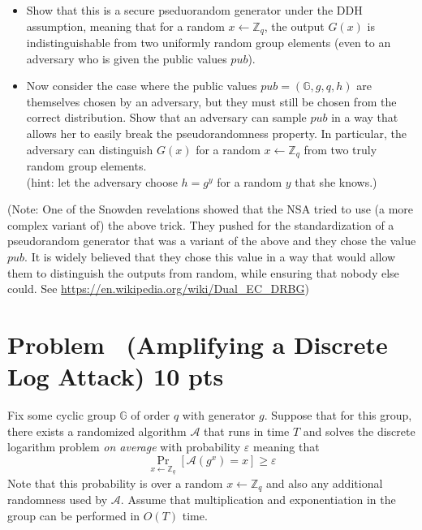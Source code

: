 \documentclass[11pt]{article}
\newcounter{pppp}
\newcommand{\prob}{\arabic{pppp}}  %
\newcommand{\increase}{\addtocounter{pppp}{1}}  %
\newcommand{\newproblem}[2]{\increase
\section*{Problem \prob~(#1) \hfill {#2}}}
\newcommand {\eps} {\varepsilon}
\renewcommand{\gets}{\leftarrow}
\newcommand {\A} {\mathcal{A}}
\newcommand {\ZZ} {\mathbb{Z}}
\def \G {\mathbb{G}}
\begin{document}
\begin{itemize}
	\item Show that this is a secure pseduorandom generator under the DDH assumption, meaning that for a random $x \gets \ZZ_q$, the output $G(x)$ is indistinguishable from two uniformly random group elements (even to an adversary who is given the public values $pub$). 

	
	\item Now consider the case where the public values $pub = (\G,g,q,h)$ are themselves chosen by an adversary, but they must still be chosen from the correct distribution. Show that an adversary can sample $pub$ in a way that allows her to easily break the pseudorandomness property. In particular, the adversary can distinguish $G(x)$ for a random  $x \gets  \ZZ_q$ from two truly random group elements.\\ (hint: let the adversary choose $h =g^y$ for a random  $y$ that she knows.)


\end{itemize}

(Note: One of the Snowden revelations showed that the NSA tried to use (a more complex variant of) the above trick. They pushed for the standardization of a pseudorandom generator that was a variant of the above and they chose the value $pub$. It is widely believed that they chose this value in a way that would allow them to distinguish the outputs from random, while ensuring that nobody else could. See \url{https://en.wikipedia.org/wiki/Dual_EC_DRBG}) 






\newproblem{Amplifying a Discrete Log Attack}{10 pts}

Fix  some cyclic group $\G$ of order $q$ with generator $g$. Suppose that for this group, there exists a randomized algorithm $\A$ that runs in time $T$ and solves the discrete logarithm problem \emph{on average} with probability $\eps$ meaning that
 $$\Pr_{x \gets \ZZ_q}[\A(g^x) =x] \geq \eps$$ Note that this probability is over a random $ x \gets \ZZ_q$ and also any additional randomness used by $\A$. Assume that multiplication and exponentiation in the group can be performed in $O(T)$ time.
\end{document}
